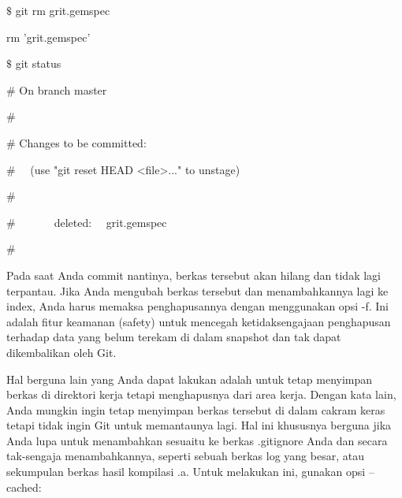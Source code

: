 \noindent 
{\fontsize{14pt}{14pt}\selectfont  $  \$  $ git rm grit.gemspec \\} \par
\noindent 
{\fontsize{14pt}{14pt}\selectfont rm 'grit.gemspec' \\} \par
\noindent 
{\fontsize{14pt}{14pt}\selectfont  $  \$  $ git status \\} \par
\noindent 
{\fontsize{14pt}{14pt}\selectfont  $  \#  $ On branch master \\} \par
\noindent 
{\fontsize{14pt}{14pt}\selectfont  $  \#  $ \\} \par
\noindent 
{\fontsize{14pt}{14pt}\selectfont  $  \#  $ Changes to be committed: \\} \par
\noindent 
{\fontsize{14pt}{14pt}\selectfont  $  \#  $~~ (use "git reset HEAD <file>..." to unstage) \\} \par
\noindent 
{\fontsize{14pt}{14pt}\selectfont  $  \#  $ \\} \par
\noindent 
{\fontsize{14pt}{14pt}\selectfont  $  \#  $~~~~~~~deleted:~~  grit.gemspec \\} \par
\noindent 
{\fontsize{14pt}{14pt}\selectfont  $  \#  $ \\} \par
\noindent 
{\fontsize{14pt}{14pt}\selectfont Pada saat Anda commit nantinya, berkas tersebut akan hilang dan tidak lagi terpantau. Jika Anda mengubah berkas tersebut dan menambahkannya lagi ke index, Anda harus memaksa penghapusannya dengan menggunakan opsi $  $-f. Ini adalah fitur keamanan (safety) untuk mencegah ketidaksengajaan penghapusan terhadap data yang belum terekam di dalam snapshot dan tak dapat dikembalikan oleh Git. \\} \par
\noindent 
{\fontsize{14pt}{14pt}\selectfont Hal berguna lain yang Anda dapat lakukan adalah untuk tetap menyimpan berkas di direktori kerja tetapi menghapusnya dari area kerja. Dengan kata lain, Anda mungkin ingin tetap menyimpan berkas tersebut di dalam cakram keras tetapi tidak ingin Git untuk memantaunya lagi. Hal ini khususnya berguna jika Anda lupa untuk menambahkan sesuaitu ke berkas $  $.gitignore $  $Anda dan secara tak-sengaja menambahkannya, seperti sebuah berkas log yang besar, atau sekumpulan berkas hasil kompilasi $  $.a. Untuk melakukan ini, gunakan opsi $  $--cached: \\} \par
